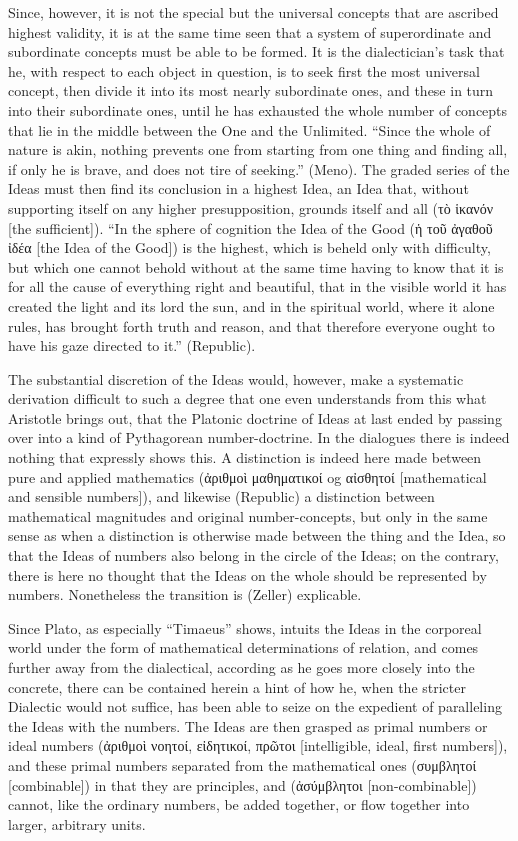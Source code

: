 \documentclass[12pt]{book}
\begin{document}
Since, however, it is not the special but the universal concepts that are ascribed highest validity,
it is at the same time seen that a system of superordinate and subordinate concepts must be able to
be formed. It is the dialectician's task that he, with respect to each object in question, is to seek
first the most universal concept, then divide it into its most nearly subordinate ones, and these in
turn into their subordinate ones, until he has exhausted the whole number of concepts that lie in the
middle between the One and the Unlimited. ``Since the whole of nature is akin, nothing prevents one
from starting from one thing and finding all, if only he is brave, and does not tire of seeking.''
(Meno). The graded series of the Ideas must then find its conclusion in a highest Idea, an Idea that,
without supporting itself on any higher presupposition, grounds itself and all (τὸ ἱκανόν [the
sufficient]). ``In the sphere of cognition the Idea of the Good (ἡ τοῦ ἀγαθοῦ ἰδέα [the Idea of the
Good]) is the highest, which is beheld only with difficulty, but which one cannot behold without at
the same time having to know that it is for all the cause of everything right and beautiful, that in
the visible world it has created the light and its lord the sun, and in the spiritual world, where
it alone rules, has brought forth truth and reason, and that therefore everyone ought to have his
gaze directed to it.'' (Republic).

The substantial discretion of the Ideas would, however, make a systematic derivation difficult to
such a degree that one even understands from this what Aristotle brings out, that the Platonic
doctrine of Ideas at last ended by passing over into a kind of Pythagorean number-doctrine. In the
dialogues there is indeed nothing that expressly shows this. A distinction is indeed here made
between pure and applied mathematics (ἀριθμοὶ
μαθηματικοί og αἰσθητοί [mathematical and sensible numbers]), and likewise (Republic) a distinction
between mathematical magnitudes and original number-concepts, but only in the same sense as when a
distinction is otherwise made between the thing and the Idea, so that the Ideas of numbers also belong
in the circle of the Ideas; on the contrary, there is here no thought that the Ideas on the whole
should be represented by numbers. Nonetheless the transition is (Zeller) explicable.

Since Plato, as especially ``Timaeus'' shows, intuits the Ideas in the corporeal world under the form
of mathematical determinations of relation, and comes further away from the dialectical, according as
he goes more closely into the concrete, there can be contained herein a hint of how he, when the
stricter Dialectic would not suffice, has been able to seize on the expedient of paralleling the Ideas
with the numbers. The Ideas are then grasped as primal numbers or ideal numbers (ἀριθμοὶ νοητοί,
εἰδητικοί, πρῶτοι [intelligible, ideal, first numbers]), and these primal numbers separated from the
mathematical ones (συμβλητοί [combinable]) in that they are principles, and (ἀσύμβλητοι [non-combinable])
cannot, like the ordinary numbers, be added together, or flow together into larger, arbitrary units.
\end{document}
